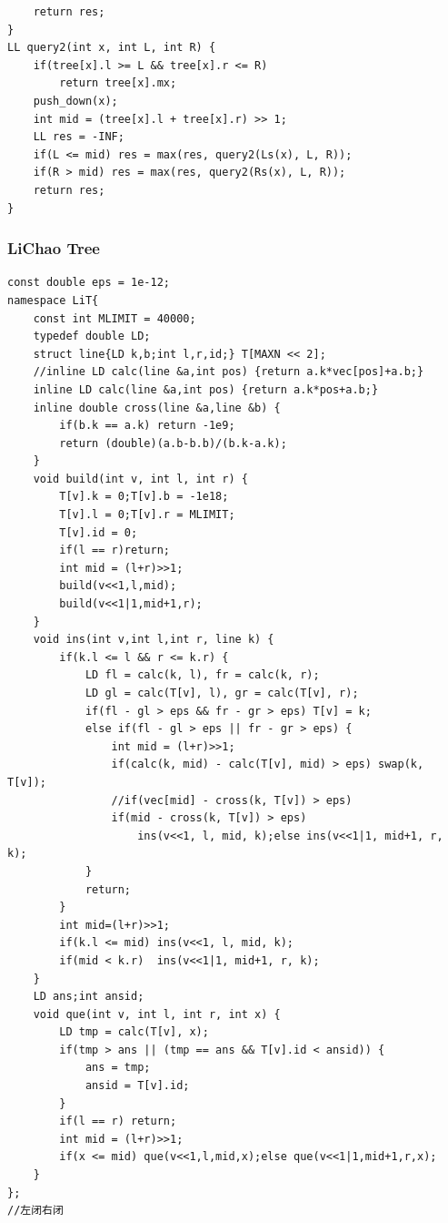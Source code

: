 \documentclass[10pt]{ctexart}
\begin{document}
{\begin{lstlisting}
    return res;
}
LL query2(int x, int L, int R) {
    if(tree[x].l >= L && tree[x].r <= R)
        return tree[x].mx;
    push_down(x);
    int mid = (tree[x].l + tree[x].r) >> 1;
    LL res = -INF;
    if(L <= mid) res = max(res, query2(Ls(x), L, R));
    if(R > mid) res = max(res, query2(Rs(x), L, R));
    return res;
}
\end{lstlisting}
\subsubsection{LiChao Tree}
\begin{lstlisting}
const double eps = 1e-12;
namespace LiT{
	const int MLIMIT = 40000;
	typedef double LD;
	struct line{LD k,b;int l,r,id;} T[MAXN << 2];
	//inline LD calc(line &a,int pos) {return a.k*vec[pos]+a.b;}
	inline LD calc(line &a,int pos) {return a.k*pos+a.b;}
	inline double cross(line &a,line &b) {
		if(b.k == a.k) return -1e9;
		return (double)(a.b-b.b)/(b.k-a.k);
	}
	void build(int v, int l, int r) {
		T[v].k = 0;T[v].b = -1e18;
		T[v].l = 0;T[v].r = MLIMIT;
		T[v].id = 0;
		if(l == r)return;
		int mid = (l+r)>>1;
		build(v<<1,l,mid);
		build(v<<1|1,mid+1,r);
	}
	void ins(int v,int l,int r, line k) {
		if(k.l <= l && r <= k.r) {
			LD fl = calc(k, l), fr = calc(k, r);
			LD gl = calc(T[v], l), gr = calc(T[v], r);
			if(fl - gl > eps && fr - gr > eps) T[v] = k;
			else if(fl - gl > eps || fr - gr > eps) {
				int mid = (l+r)>>1;
				if(calc(k, mid) - calc(T[v], mid) > eps) swap(k, T[v]);
				//if(vec[mid] - cross(k, T[v]) > eps) 
				if(mid - cross(k, T[v]) > eps) 
					ins(v<<1, l, mid, k);else ins(v<<1|1, mid+1, r, k);
			}
			return;
		}
		int mid=(l+r)>>1;
		if(k.l <= mid) ins(v<<1, l, mid, k);
		if(mid < k.r)  ins(v<<1|1, mid+1, r, k);
	}
	LD ans;int ansid;
	void que(int v, int l, int r, int x) {
		LD tmp = calc(T[v], x);
		if(tmp > ans || (tmp == ans && T[v].id < ansid)) {
			ans = tmp;
			ansid = T[v].id;
		}
		if(l == r) return;
		int mid = (l+r)>>1;
		if(x <= mid) que(v<<1,l,mid,x);else que(v<<1|1,mid+1,r,x);
    }
};
//左闭右闭
\end{lstlisting}
}
\end{document}
